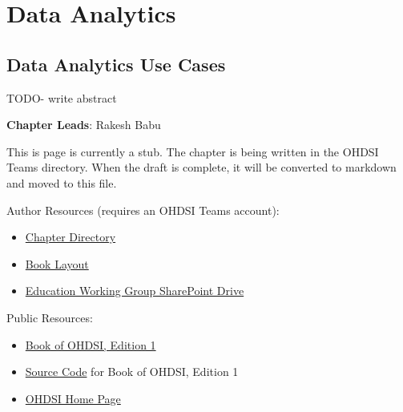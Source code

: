 \documentclass[
  letterpaper,
  paper=7in:10in,
  pagesize=pdftex,
  headinclude=on,
  footinclude=on,
  12pt]{scrbook}
\providecommand{\tightlist}{%
  \setlength{\itemsep}{0pt}\setlength{\parskip}{0pt}}\usepackage{longtable,booktabs,array}
\begin{document}
\part{Data Analytics}

\chapter{Data Analytics Use Cases}\label{sec-analytics-cases}

TODO- write abstract

\hfill\break

\textbf{Chapter Leads}: Rakesh Babu

\begin{tcolorbox}[enhanced jigsaw, opacitybacktitle=0.6, coltitle=black, colback=white, bottomrule=.15mm, bottomtitle=1mm, title=\textcolor{quarto-callout-note-color}{\faInfo}\hspace{0.5em}{Note}, titlerule=0mm, rightrule=.15mm, colbacktitle=quarto-callout-note-color!10!white, colframe=quarto-callout-note-color-frame, toptitle=1mm, arc=.35mm, left=2mm, breakable, opacityback=0, leftrule=.75mm, toprule=.15mm]

This is page is currently a stub. The chapter is being written in the
OHDSI Teams directory. When the draft is complete, it will be converted
to markdown and moved to this file.

Author Resources (requires an OHDSI Teams account):

\begin{itemize}
\tightlist
\item
  \href{https://ohdsiorg.sharepoint.com/sites/Workgroup-EducationWorkingGroup/Shared\%20Documents/Forms/AllItems.aspx?id=\%2Fsites\%2FWorkgroup\%2DEducationWorkingGroup\%2FShared\%20Documents\%2FSection\%20III\%20\%2D\%20Analytics\%2FChapter\%208\%20Introduction&viewid=05fec2cc\%2Dec8a\%2D4d04\%2Db565\%2Dcf1289b96f67}{Chapter
  Directory}
\item
  \href{https://ohdsiorg.sharepoint.com/:x:/r/sites/Workgroup-EducationWorkingGroup/_layouts/15/Doc2.aspx?action=edit&sourcedoc=\%7B1fa31e39-1c5f-4918-b878-609ebd9810b3\%7D&wdOrigin=TEAMS-WEB.teamsSdk_ns.rwc&wdExp=TEAMS-TREATMENT&wdhostclicktime=1748104477731&web=1}{Book
  Layout}
\item
  \href{https://ohdsiorg.sharepoint.com/sites/Workgroup-EducationWorkingGroup/Shared\%20Documents/Forms/AllItems.aspx?viewid=05fec2cc\%2Dec8a\%2D4d04\%2Db565\%2Dcf1289b96f67}{Education
  Working Group SharePoint Drive}
\end{itemize}

Public Resources:

\begin{itemize}
\tightlist
\item
  \href{https://ohdsi.github.io/TheBookOfOhdsi/}{Book of OHDSI, Edition
  1}
\item
  \href{https://github.com/OHDSI/TheBookOfOhdsi}{Source Code} for Book
  of OHDSI, Edition 1
\item
  \href{https://ohdsi.org/}{OHDSI Home Page}
\end{itemize}

\end{tcolorbox}
\end{document}
